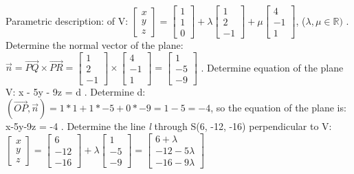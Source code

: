 Parametric description: of V: 
$\begin{bmatrix} x \\ y \\ z\end{bmatrix} = \begin{bmatrix} 1 \\ 1 \\ 0\end{bmatrix} + \lambda \begin{bmatrix} 1 \\ 2 \\ -1 \end{bmatrix} + \mu \begin{bmatrix} 4 \\ -1 \\ 1\end{bmatrix}$, ($\lambda, \mu \in \mathbb{R})$
. Determine the normal vector of the plane:
\newline
$\vec{n} = \vec{PQ} \times \vec{PR} = \begin{bmatrix} 1 \\ 2 \\ -1 \end{bmatrix} \times \begin{bmatrix} 4 \\ -1 \\ 1 \end{bmatrix} = \begin{bmatrix} 1 \\ -5 \\ -9 \end{bmatrix}$
. Determine equation of the plane V:
\newline
x - 5y - 9z = d
. Determine d:
\newline
$(\vec{OP}, \vec{n}) = 1 * 1 + 1 * -5 + 0 * -9 = 1 - 5 = -4$, so the equation of the plane is:
x-5y-9z = -4
. Determine the line \textit{l} through S(6, -12, -16) perpendicular to V:
\newline
$\begin{bmatrix} x \\ y \\ z\end{bmatrix} = \begin{bmatrix} 6 \\ -12 \\ -16\end{bmatrix} + \lambda \begin{bmatrix} 1 \\ -5 \\ -9 \end{bmatrix} = \begin{bmatrix} 6 + \lambda \\ -12 - 5\lambda \\ -16 - 9\lambda \end{bmatrix}$
